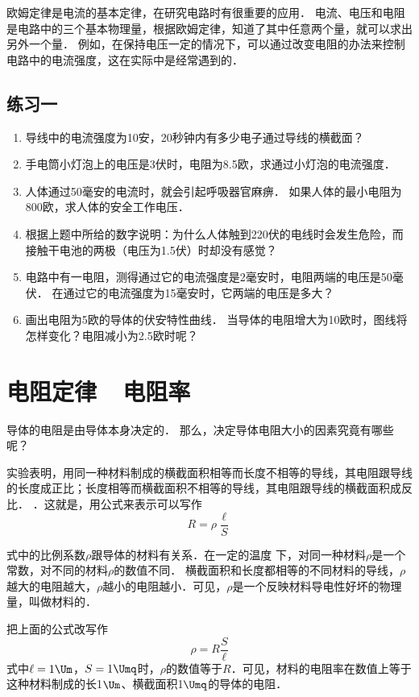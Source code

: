 欧姆定律是电流的基本定律，在研究电路时有很重要的应用．
电流、电压和电阻是电路中的三个基本物理量，根据欧姆定律，知道了其中任意两个量，就可以求出另外一个量．
例如，在保持电压一定的情况下，可以通过改变电阻的办法来控制电路中的电流强度，这在实际中是经常遇到的．


\subsection*{练习一}

\begin{enumerate}
    \item 导线中的电流强度为10安，20秒钟内有多少电子通过导线的横截面？
    \item 手电筒小灯泡上的电压是3伏时，电阻为8.5欧，求通过小灯泡的电流强度．
    \item 人体通过50毫安的电流时，就会引起呼吸器官麻痹．
    如果人体的最小电阻为800欧，求人体的安全工作电压．
    \item 根据上题中所给的数字说明：为什么人体触到220伏的电线时会发生危险，而接触干电池的两极（电压为1.5伏）时却没有感觉？
    \item 电路中有一电阻，测得通过它的电流强度是2毫安时，电阻两端的电压是50毫伏．
    在通过它的电流强度为15毫安时，它两端的电压是多大？
    \item 画出电阻为5欧的导体的伏安特性曲线．
    当导体的电阻增大为10欧时，图线将怎样变化？电阻减小为2.5欧时呢？
\end{enumerate}


\section{电阻定律~~电阻率}
导体的电阻是由导体本身决定的．
那么，决定导体电阻大小的因素究竟有哪些呢？

实验表明，用同一种材料制成的横截面积相等而长度不相等的导线，其电阻跟导线的长度成正比；长度相等而横截面积不相等的导线，其电阻跟导线的横截面积成反比．
．这就是，用公式来表示可以写作
\[R=\rho\frac{\ell}{S}\]

式中的比例系数$\rho$跟导体的材料有关系．在一定的温度
下，对同一种材料$\rho$是一个常数，对不同的材料$\rho$的数值不同．
横截面积和长度都相等的不同材料的导线，$\rho$越大的电阻越大，$\rho$越小的电阻越小．可见，$\rho$是一个反映材料导电性好坏的物理量，叫做材料的．

把上面的公式改写作
\[\rho=R\frac{S}{\ell}\]
式中$\ell=1 \Um$，$S=1\Umq$时，$\rho$的数值等于$R$．可见，材料的电阻率在数值上等于这种材料制成的长1$\Um$、横截面积1$\Umq$的导体的电阻．

